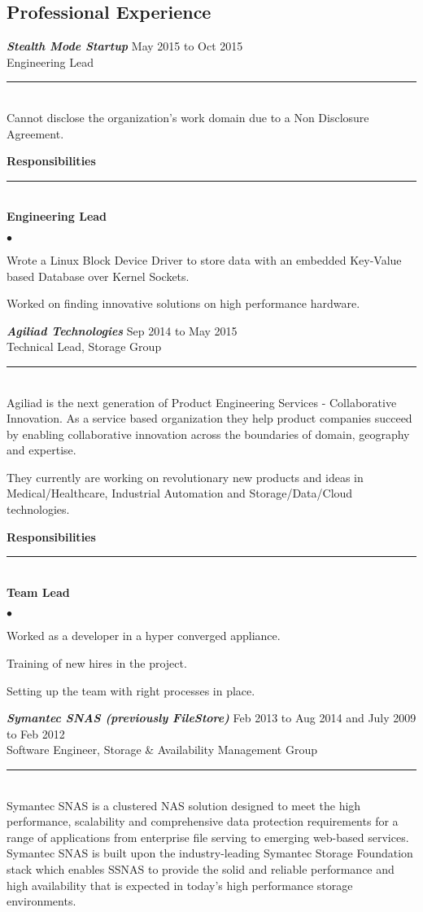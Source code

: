 \documentclass[letterpaper,margin,line]{RES}
\newenvironment{list2}{
  \begin{list}{$\bullet$}{%
      \setlength{\itemsep}{1pt}
      \setlength{\parsep}{0in} \setlength{\parskip}{0in}
      \setlength{\topsep}{0in} \setlength{\partopsep}{0in} 
      \setlength{\leftmargin}{0.2in}}}{\end{list}}
\def\myline{\\\rule{\textwidth}{1pt}\\}
\def\mmyline{\\\rule{\textwidth}{.5pt}\\}
\begin{document}
\begin{resume}
\section{\sc Professional Experience }



{\sl \bf Stealth Mode Startup } \hfill May 2015 to Oct 2015 \\
		 Engineering Lead
       \myline
	   Cannot disclose the organization's work domain due to a Non Disclosure
	   Agreement.


{ \bf Responsibilities}
\mmyline

{ \bf Engineering Lead  }
	\begin{list2}
	\item Wrote a Linux Block Device Driver to store data with an embedded Key-Value based Database over Kernel Sockets.
    \item Worked on finding innovative solutions on high performance hardware.
	\end{list2}

{\sl \bf Agiliad Technologies } \hfill Sep 2014 to May 2015 \\
		 Technical Lead, Storage Group
       \myline

		Agiliad is the next generation of Product Engineering Services -
		Collaborative Innovation. As a service based organization they help
		product companies succeed by enabling collaborative innovation across
		the boundaries of domain, geography and expertise.

		They currently are working on revolutionary new products and ideas in
		Medical/Healthcare, Industrial Automation and Storage/Data/Cloud
		technologies. 

{ \bf Responsibilities}
\mmyline

{ \bf Team Lead  }
	\begin{list2}
    \item Worked as a developer in a hyper converged appliance.
    \item Training of new hires in the project.
	\item Setting up the team with right processes in place.\end{list2}


{\sl \bf Symantec SNAS (previously FileStore)} \hfill Feb 2013 to Aug 2014 and July 2009 to Feb 2012 \\
		 Software Engineer, Storage \& Availability Management
		 Group
       \myline
       Symantec SNAS is a clustered NAS solution designed to meet the high
       performance, scalability and comprehensive data protection requirements
       for a range of applications from enterprise file serving to emerging
       web-based services. Symantec SNAS is built upon the industry-leading
       Symantec Storage Foundation stack which enables SSNAS to provide the
       solid and reliable performance and high availability that is expected in
       today’s high performance storage environments.


\end{resume}
\end{document}
